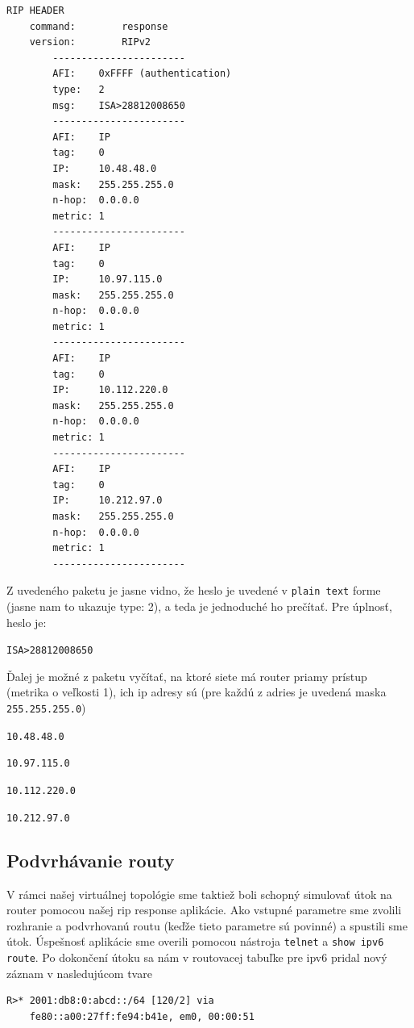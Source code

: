 \documentclass{report}
\begin{document}
    \begin{lstlisting}[style=DOS]
    RIP HEADER
    command:        response
    version:        RIPv2
        -----------------------
        AFI:    0xFFFF (authentication)
        type:   2
        msg:    ISA>28812008650
        -----------------------
        AFI:    IP
        tag:    0
        IP:     10.48.48.0
        mask:   255.255.255.0
        n-hop:  0.0.0.0
        metric: 1
        -----------------------
        AFI:    IP
        tag:    0
        IP:     10.97.115.0
        mask:   255.255.255.0
        n-hop:  0.0.0.0
        metric: 1
        -----------------------
        AFI:    IP
        tag:    0
        IP:     10.112.220.0
        mask:   255.255.255.0
        n-hop:  0.0.0.0
        metric: 1
        -----------------------
        AFI:    IP
        tag:    0
        IP:     10.212.97.0
        mask:   255.255.255.0
        n-hop:  0.0.0.0
        metric: 1
        -----------------------
    \end{lstlisting}
    
    Z uvedeného paketu je jasne vidno, že heslo je uvedené v \verb|plain text| forme (jasne nam to ukazuje type: 2), a teda je jednoduché ho prečítať. Pre úplnosť, heslo je:
    
    \verb|ISA>28812008650|
    
    Ďalej je možné z paketu vyčítať, na ktoré siete má router priamy prístup (metrika o veľkosti 1), ich ip adresy sú (pre každú z adries je uvedená maska \verb|255.255.255.0|)
    
    \verb|10.48.48.0|
    
    \verb|10.97.115.0|
    
    \verb|10.112.220.0|
    
    \verb|10.212.97.0|
    
    \subsection{Podvrhávanie routy}
    
    V rámci našej virtuálnej topológie sme taktiež boli schopný simulovať útok na router pomocou našej rip response aplikácie. Ako vstupné parametre sme zvolili rozhranie a podvrhovanú routu (keďže tieto parametre sú povinné) a spustili sme útok. Úspešnosť aplikácie sme overili pomocou nástroja \verb|telnet| a \verb|show ipv6 route|. Po dokončení útoku sa nám v routovacej tabuľke pre ipv6 pridal nový záznam v nasledujúcom tvare
    
    \begin{lstlisting}[style=DOS]
    R>* 2001:db8:0:abcd::/64 [120/2] via
    fe80::a00:27ff:fe94:b41e, em0, 00:00:51
    \end{lstlisting}
    
\end{document}
